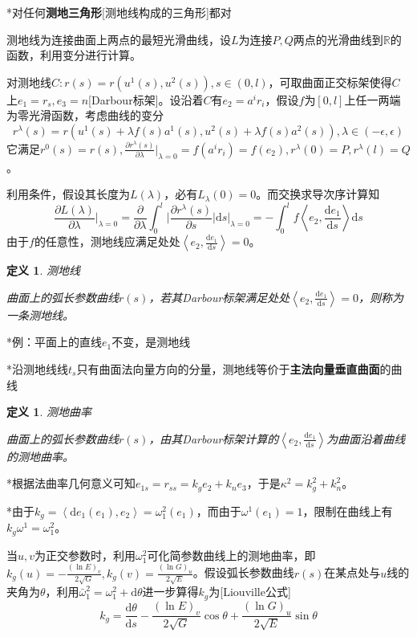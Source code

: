 \documentclass[a4paper,UTF8,fontset=windows]{ctexart}
\newtheorem{dfn}[thm]{定义}
\begin{document}
*对任何\textbf{测地三角形}[测地线构成的三角形]都对

测地线为连接曲面上两点的最短光滑曲线，设$L$为连接$P,Q$两点的光滑曲线到$\mathbb{R}$的函数，利用变分进行计算。

对测地线$C:r(s)=r(u^1(s),u^2(s)),s\in(0,l)$，可取曲面正交标架使得$C$上$e_1=r_s,e_3=n$[Darbour标架]。设沿着$C$有$e_2=a^ir_i$，假设$f$为$[0,l]$上任一两端为零光滑函数，考虑曲线的变分
$$r^\lambda(s)=r(u^1(s)+\lambda f(s)a^1(s),u^2(s)+\lambda f(s)a^2(s)),\lambda\in(-\epsilon,\epsilon)$$
它满足$r^0(s)=r(s),\frac{\partial{r^\lambda(s)}}{\partial{\lambda}}\big|_{\lambda=0}=f(a^ir_i)=f(e_2),r^\lambda(0)=P,r^\lambda(l)=Q$。

利用条件，假设其长度为$L(\lambda)$，必有$L_\lambda(0)=0$。而交换求导次序计算知
$$\frac{\partial{L(\lambda)}}{\partial\lambda}\bigg|_{\lambda=0}=\frac{\partial}{\partial\lambda}\int_0^l\bigg|\frac{\partial r^\lambda(s)}{\partial s}\bigg|\mathrm{d}s\bigg|_{\lambda=0}=-\int_0^lf\left<e_2,\frac{\mathrm{d}e_1}{\mathrm{d}s}\right>\mathrm{d}s$$
由于$f$的任意性，测地线应满足处处$\left<e_2,\frac{\mathrm{d}e_1}{\mathrm{d}s}\right>=0$。

\begin{dfn} 测地线

曲面上的弧长参数曲线$r(s)$，若其Darbour标架满足处处$\left<e_2,\frac{\mathrm{d}e_1}{\mathrm{d}s}\right>=0$，则称为一条测地线。
\end{dfn}

*例：平面上的直线$e_1$不变，是测地线

*沿测地线线$t_s$只有曲面法向量方向的分量，测地线等价于\textbf{主法向量垂直曲面}的曲线

\begin{dfn} 测地曲率

曲面上的弧长参数曲线$r(s)$，由其Darbour标架计算的$\left<e_2,\frac{\mathrm{d}e_1}{\mathrm{d}s}\right>$为曲面沿着曲线的测地曲率。    
\end{dfn}

*根据法曲率几何意义可知$e_{1s}=r_{ss}=k_ge_2+k_ne_3$，于是$\kappa^2=k_g^2+k_n^2$。

*由于$k_g=\left<\mathrm{d}e_1(e_1),e_2\right>=\omega_1^2(e_1)$，而由于$\omega^1(e_1)=1$，限制在曲线上有$k_g\omega^1=\omega_1^2$。

当$u,v$为正交参数时，利用$\omega_1^2$可化简参数曲线上的测地曲率，即$k_g(u)=-\frac{(\ln E)_v}{2\sqrt{G}},k_g(v)=\frac{(\ln G)_u}{2\sqrt{E}}$。假设弧长参数曲线$r(s)$在某点处与$u$线的夹角为$\theta$，利用$\bar{\omega}_1^2=\omega_1^2+\mathrm{d}\theta$进一步算得$k_g$为[Liouville公式]
$$k_g=\frac{\mathrm{d}\theta}{\mathrm{d}s}-\frac{(\ln E)_v}{2\sqrt{G}}\cos\theta+\frac{(\ln G)_u}{2\sqrt{E}}\sin\theta$$
\end{document}
